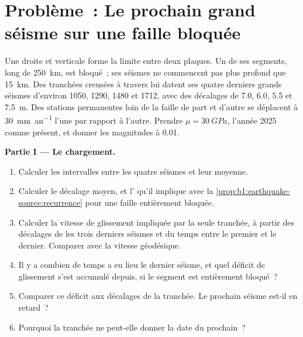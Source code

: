 \section{Problème~: Le prochain grand séisme sur une faille bloquée}

\begin{problem}
\label{pb:b1:earthquake-source:1}
Une  droite et verticale forme la limite entre deux plaques.
Un de ses segments, long de \qty{250}{km}, est bloqué~; ses séismes ne commencent pas
plus profond que \qty{15}{km}. Des tranchées creusées à travers lui datent ses quatre derniers grands
séismes d'environ 1050, 1290, 1480 et 1712, avec des décalages de \num{7.0},
\num{6.0}, \num{5.5} et \qty{7.5}{m}. Des stations permanentes loin de la faille de
part et d'autre se déplacent à \qty{30}{mm.an^{-1}} l'une par rapport à l'autre. Prendre $\mu =
\qty{30}{GPa}$, l'année 2025 comme présent, et donner les magnitudes à 0.01.

\medskip
\noindent\textbf{Partie I --- Le chargement.}
\begin{enumerate}
  \item Calculer les intervalles entre les quatre séismes et leur moyenne.
  \item Calculer le décalage moyen, et l' qu'il implique avec
        la \cref{prop:b1:earthquake-source:recurrence} pour une faille entièrement bloquée.
  \item Calculer la vitesse de glissement impliquée par la seule tranchée, à partir des décalages de
        les trois derniers séismes et du temps entre le premier et le dernier.
        Comparer avec la vitesse géodésique.
  \item Il y a combien de temps a eu lieu le dernier séisme, et quel déficit de glissement s'est
        accumulé depuis, si le segment est entièrement bloqué~?
  \item Comparer ce déficit aux décalages de la tranchée. Le prochain
        séisme est-il en retard~?
  \item Pourquoi la tranchée ne peut-elle donner la date du prochain~?
\end{enumerate}


\end{problem}
